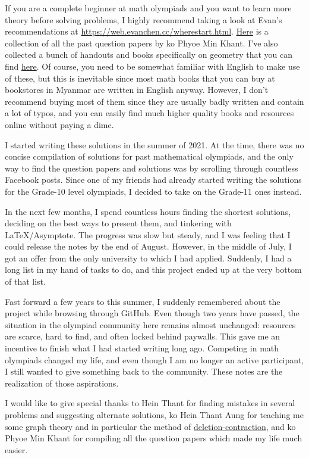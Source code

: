 If you are a complete beginner at math olympiads and you want to learn more
theory before solving problems, I highly recommend taking a look at Evan's
recommendations at
\url{https://web.evanchen.cc/wherestart.html}.
\href{https://drive.google.com/drive/folders/1p4-khER6GDk9UJ7AWCp-sSLoB_TCruyV?usp=drive_link}{Here}
is a collection of all the past question papers by ko Phyoe Min Khant.
I've also collected a bunch of handouts and books specifically on geometry that
you can find
\href{https://drive.google.com/drive/folders/1ABGT3_tQgPxxL_Ri81CVpBOYeMzgH-Wt?usp=drive_link}{here}.
Of course, you need to be somewhat familiar with English to make use of these,
but this is inevitable since most math books that you can buy at bookstores in
Myanmar are written in English anyway. However, I don't recommend buying most of them
since they are usually badly written and contain a lot of typos, and you can
easily find much higher quality books and resources online without paying a
dime.

I started writing these solutions in the summer of 2021. At the time, there was
no concise compilation of solutions for past mathematical olympiads, and the only way
to find the question papers and solutions was by scrolling through countless
Facebook posts. Since one of my friends had already started writing the
solutions for the Grade-10 level olympiads, I decided to take on the Grade-11
ones instead.

In the next few months, I spend countless hours finding the shortest solutions,
deciding on the best ways to present them, and tinkering with \LaTeX/Asymptote.
The progress was slow but steady, and I was feeling that I could release the
notes by the end of August. However, in the middle of July, I got an offer from
the only university to which I had applied. Suddenly, I had a long list in my
hand of tasks to do, and this project ended up at the very bottom of that list.

Fast forward a few years to this summer, I suddenly remembered about
the project while browsing through GitHub. Even though two years have passed, the
situation in the olympiad community here remains almost unchanged: resources are
scarce, hard to find, and often locked behind paywalls. This gave me an
incentive to finish what I had started writing long ago. Competing in math
olympiads changed my life, and even though I am no longer an active participant,
I still wanted to give something back to the community. These notes are the
realization of those aspirations.

I would like to give special thanks to Hein Thant for finding mistakes in
several problems and suggesting alternate solutions, ko Hein Thant Aung for
teaching me some graph theory and in particular the method of \hyperref[teq:
DC]{deletion-contraction}, and ko Phyoe Min Khant for compiling all the question
papers which made my life much easier.
